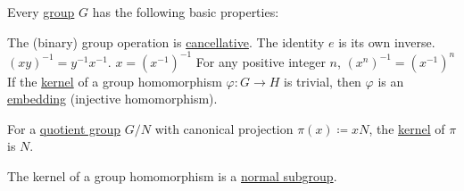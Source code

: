 \begin{proposition}\label{thm:def:group/properties}
  Every \hyperref[def:group]{group} \( G \) has the following basic properties:
  \begin{thmenum}
     The (binary) group operation is \hyperref[def:magma/cancellative]{cancellative}.
     The identity \( e \) is its own inverse.
     \( (xy)^{-1} = y^{-1} x^{-1} \).
     \( x = (x^{-1})^{-1} \)
     For any positive integer \( n \), \( (x^n)^{-1} = (x^{-1})^n \)
     If the \hyperref[def:group/kernel]{kernel} of a group homomorphism \( \varphi: G \to H \) is trivial, then \( \varphi \) is an \hyperref[def:first_order_homomorphism_invertibility/embedding]{embedding} (injective homomorphism).

     For a \hyperref[def:group/quotient]{quotient group} \( G / N \) with canonical projection \( \pi(x) \coloneqq xN \), the \hyperref[def:group/kernel]{kernel} of \( \pi \) is \( N \).

     The kernel of a group homomorphism is a \hyperref[thm:normal_subgroup]{normal subgroup}.
  \end{thmenum}
\end{proposition}
